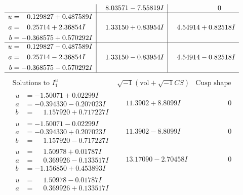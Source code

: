 \documentclass[1p]{elsarticle_modified}
\theoremstyle{definition}
\newcommand{\I}{\sqrt{-1}}
\begin{document}
$$\begin{array}{c|c|c}
 & \phantom{-}8.03571 - 7.55819 I & \phantom{-0.000000 } 0 \\ \hline\begin{aligned}
u &= \phantom{-}0.129827 + 0.487589 I \\
a &= \phantom{-}0.25714 + 2.36854 I \\
b &= -0.368575 + 0.570292 I\end{aligned}
 & \phantom{-}1.33150 + 0.83954 I & \phantom{-}4.54914 + 0.82518 I \\ \hline\begin{aligned}
u &= \phantom{-}0.129827 - 0.487589 I \\
a &= \phantom{-}0.25714 - 2.36854 I \\
b &= -0.368575 - 0.570292 I\end{aligned}
 & \phantom{-}1.33150 - 0.83954 I & \phantom{-}4.54914 - 0.82518 I\\
 \hline 
 \end{array}$$\newpage$$\begin{array}{c|c|c}  
\text{Solutions to }I^u_{1}& \I (\text{vol} + \sqrt{-1}CS) & \text{Cusp shape}\\
 \hline 
\begin{aligned}
u &= -1.50071 + 0.02299 I \\
a &= -0.394330 - 0.207023 I \\
b &= \phantom{-}1.157920 + 0.717227 I\end{aligned}
 & \phantom{-}11.3902 + 8.8099 I & \phantom{-0.000000 } 0 \\ \hline\begin{aligned}
u &= -1.50071 - 0.02299 I \\
a &= -0.394330 + 0.207023 I \\
b &= \phantom{-}1.157920 - 0.717227 I\end{aligned}
 & \phantom{-}11.3902 - 8.8099 I & \phantom{-0.000000 } 0 \\ \hline\begin{aligned}
u &= \phantom{-}1.50978 + 0.01787 I \\
a &= \phantom{-}0.369926 - 0.133517 I \\
b &= -1.156850 + 0.453893 I\end{aligned}
 & \phantom{-}13.17090 - 2.70458 I & \phantom{-0.000000 } 0 \\ \hline\begin{aligned}
u &= \phantom{-}1.50978 - 0.01787 I \\
a &= \phantom{-}0.369926 + 0.133517 I \\

\end{aligned}
\end{array}$$
\end{document}
